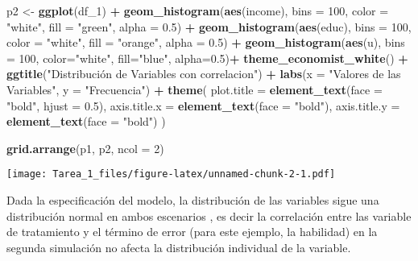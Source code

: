 \documentclass[
]{article}
\newenvironment{Shaded}{\begin{snugshade}}{\end{snugshade}}
\newcommand{\AttributeTok}[1]{\textcolor[rgb]{0.13,0.29,0.53}{#1}}
\newcommand{\DecValTok}[1]{\textcolor[rgb]{0.00,0.00,0.81}{#1}}
\newcommand{\FloatTok}[1]{\textcolor[rgb]{0.00,0.00,0.81}{#1}}
\newcommand{\FunctionTok}[1]{\textcolor[rgb]{0.13,0.29,0.53}{\textbf{#1}}}
\newcommand{\NormalTok}[1]{#1}
\newcommand{\OtherTok}[1]{\textcolor[rgb]{0.56,0.35,0.01}{#1}}
\newcommand{\SpecialCharTok}[1]{\textcolor[rgb]{0.81,0.36,0.00}{\textbf{#1}}}
\newcommand{\StringTok}[1]{\textcolor[rgb]{0.31,0.60,0.02}{#1}}
\begin{document}
\begin{Shaded}
\begin{Highlighting}[]
\NormalTok{p2 }\OtherTok{\textless{}{-}} \FunctionTok{ggplot}\NormalTok{(df\_1) }\SpecialCharTok{+} 
  \FunctionTok{geom\_histogram}\NormalTok{(}\FunctionTok{aes}\NormalTok{(income), }\AttributeTok{bins =} \DecValTok{100}\NormalTok{, }\AttributeTok{color =} \StringTok{"white"}\NormalTok{, }\AttributeTok{fill =} \StringTok{"green"}\NormalTok{, }\AttributeTok{alpha =} \FloatTok{0.5}\NormalTok{) }\SpecialCharTok{+} 
  \FunctionTok{geom\_histogram}\NormalTok{(}\FunctionTok{aes}\NormalTok{(educ), }\AttributeTok{bins =} \DecValTok{100}\NormalTok{, }\AttributeTok{color =} \StringTok{"white"}\NormalTok{, }\AttributeTok{fill =} \StringTok{"orange"}\NormalTok{, }\AttributeTok{alpha =} \FloatTok{0.5}\NormalTok{) }\SpecialCharTok{+}
  \FunctionTok{geom\_histogram}\NormalTok{(}\FunctionTok{aes}\NormalTok{(u), }\AttributeTok{bins =} \DecValTok{100}\NormalTok{, }\AttributeTok{color=}\StringTok{"white"}\NormalTok{, }\AttributeTok{fill=}\StringTok{"blue"}\NormalTok{, }\AttributeTok{alpha=}\FloatTok{0.5}\NormalTok{)}\SpecialCharTok{+}
  \FunctionTok{theme\_economist\_white}\NormalTok{() }\SpecialCharTok{+}
  \FunctionTok{ggtitle}\NormalTok{(}\StringTok{"Distribución de Variables con correlacion"}\NormalTok{) }\SpecialCharTok{+}
  \FunctionTok{labs}\NormalTok{(}\AttributeTok{x =} \StringTok{"Valores de las Variables"}\NormalTok{, }\AttributeTok{y =} \StringTok{"Frecuencia"}\NormalTok{) }\SpecialCharTok{+} 
  \FunctionTok{theme}\NormalTok{(}
    \AttributeTok{plot.title =} \FunctionTok{element\_text}\NormalTok{(}\AttributeTok{face =} \StringTok{"bold"}\NormalTok{, }\AttributeTok{hjust =} \FloatTok{0.5}\NormalTok{),  }
    \AttributeTok{axis.title.x =} \FunctionTok{element\_text}\NormalTok{(}\AttributeTok{face =} \StringTok{"bold"}\NormalTok{),  }
    \AttributeTok{axis.title.y =} \FunctionTok{element\_text}\NormalTok{(}\AttributeTok{face =} \StringTok{"bold"}\NormalTok{)}
\NormalTok{  )}


\FunctionTok{grid.arrange}\NormalTok{(p1, p2, }\AttributeTok{ncol =} \DecValTok{2}\NormalTok{)}
\end{Highlighting}
\end{Shaded}

\texttt{[image: Tarea\_1\_files/figure-latex/unnamed-chunk-2-1.pdf]}

Dada la especificación del modelo, la distribución de las variables
sigue una distribución normal en ambos escenarios , es decir la
correlación entre las variable de tratamiento y el término de error
(para este ejemplo, la habilidad) en la segunda simulación no afecta la
distribución individual de la variable.
\end{document}

